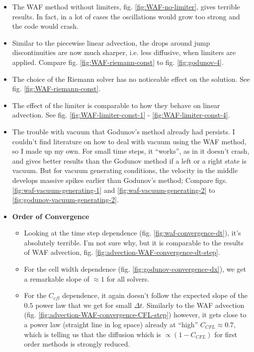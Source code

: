 \begin{itemize}

	\item 	The WAF method without limiters, fig. \ref{fig:WAF-no-limiter}, gives terrible results.
			In fact, in a lot of cases the oscillations would grow too strong and the code would crash.

	\item 	Similar to the piecewise linear advection, the drops around jump discontinuities are now much sharper, i.e. less diffusive, when limiters are applied.
			Compare fig. \ref{fig:WAF-riemann-const} to fig. \ref{fig:godunov-4}.

	\item 	The choice of the Riemann solver has no noticeable effect on the solution. 
			See fig. \ref{fig:WAF-riemann-const}.
	
	\item 	The effect of the limiter is comparable to how they behave on linear advection. 
			See fig. \ref{fig:WAF-limiter-const-1} - \ref{fig:WAF-limiter-const-4}.


	\item 	The trouble with vacuum that Godunov's method already had persists.
			I couldn't find literature on how to deal with vacuum using the WAF method, so I made up my own.
			For small time steps, it ``works'', as in it doesn't crash, and gives better results than the Godunov method if a left or a right state is vacuum.
			But for vacuum generating conditions, the velocity in the middle develops massive spikes earlier than Godunov's method;
			Compare figs. \ref{fig:waf-vacuum-generating-1} and \ref{fig:waf-vacuum-generating-2} to \ref{fig:godunov-vacuum-generating-2}.
			
			

	\item \textbf{Order of Convergence}
	
		\begin{itemize}
			
			\item 	Looking at the time step dependence (fig. \ref{fig:waf-convergence-dt}), it's absolutely terrible.
					I'm not sure why, but it is comparable to the results of WAF advection, fig. \ref{fig:advection-WAF-convergence-dt-step}. 
					
			\item 	For the cell width dependence (fig. \ref{fig:godunov-convergence-dx}), we get a remarkable slope of $\approx 1$ for all solvers.

			
			\item 	For the $C_{cfl}$ dependence, it again doesn't follow the expected slope of the $0.5$ power law that we get for small $\Delta t$.
					Similarly to the WAF advection (fig. \ref{fig:advection-WAF-convergence-CFL-step}) however, it gets close to a power law (straight line in log space) already at ``high'' $C_{CFL} \approx 0.7$, which is telling us that the diffusion which is $\propto (1 - C_{CFL})$ for first order methods is strongly reduced.
		\end{itemize}
\end{itemize}